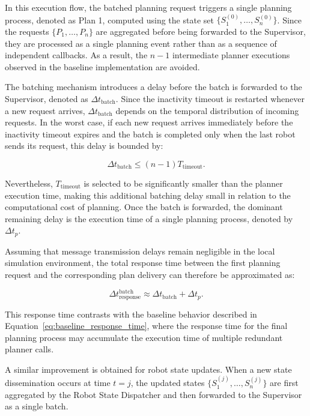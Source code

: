 In this execution flow, the batched planning request triggers a single planning process, 
denoted as Plan 1, computed using the state set $\{S_1^{(0)}, \ldots, S_n^{(0)}\}$. Since the requests $\{P_1, \ldots, P_n\}$ are aggregated before being forwarded to the Supervisor, they are processed as a single planning event rather than as a sequence of independent callbacks. As a result, the $n-1$ intermediate planner executions observed in the baseline implementation are avoided.

The batching mechanism introduces a delay before the batch is forwarded to the Supervisor, denoted as $\Delta t_{\text{batch}}$. Since the inactivity timeout is restarted whenever a new request arrives, $\Delta t_{\text{batch}}$ depends on the temporal distribution of incoming requests. In the worst case, if each new request arrives immediately before the inactivity timeout expires and the batch is completed only when the last robot sends its request, this delay is bounded by:

\begin{equation}
    \Delta t_{\text{batch}} \leq (n-1)T_{\text{timeout}}.
\end{equation}

Nevertheless, $T_{\text{timeout}}$ is selected to be significantly smaller than the planner execution time, making this additional batching delay small in relation to the computational cost of planning. Once the batch is forwarded, the dominant remaining delay is the execution time of a single planning process, denoted by $\Delta t_p$.

Assuming that message transmission delays remain negligible in the local simulation environment, the total response time between the first planning request and the corresponding plan delivery can therefore be approximated as:

\begin{equation}
    \Delta t_{\text{response}}^{\text{batch}}
    \approx
    \Delta t_{\text{batch}} + \Delta t_p.
    \label{eq:batch_response_time}
\end{equation}

This response time contrasts with the baseline behavior described in Equation~\ref{eq:baseline_response_time}, where the response time for the final planning process may accumulate the execution time of multiple redundant planner calls.

A similar improvement is obtained for robot state updates. When a new state dissemination occurs at time $t=j$, the updated states $\{S_1^{(j)}, \ldots, S_n^{(j)}\}$ are first aggregated by the Robot State Dispatcher and then forwarded to the Supervisor as a single batch. 

